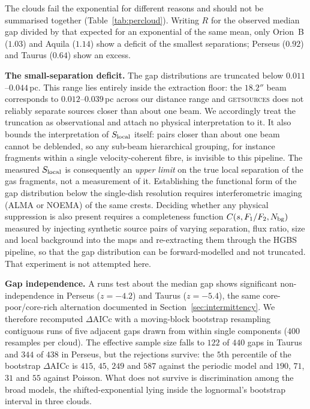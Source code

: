 \documentclass[usenatbib,twoside,twocolumn]{mnras}
\begin{document}
The clouds fail the exponential for different reasons and should not be summarised together (Table~\ref{tab:percloud}). Writing $R$ for the observed median gap divided by that expected for an exponential of the same mean, only Orion~B ($1.03$) and Aquila ($1.14$) show a deficit of the smallest separations; Perseus ($0.92$) and Taurus ($0.64$) show an excess.

\smallskip\noindent\textbf{The small-separation deficit.} The gap distributions are truncated below $0.011$--$0.044$\,pc. This range lies entirely inside the extraction floor: the $18.2''$ beam corresponds to $0.012$--$0.039$\,pc across our distance range and \textsc{getsources} does not reliably separate sources closer than about one beam. We accordingly treat the truncation as observational and attach no physical interpretation to it. It also bounds the interpretation of $S_{\rm local}$ itself: pairs closer than about one beam cannot be deblended, so any sub-beam hierarchical grouping, for instance fragments within a single velocity-coherent fibre, is invisible to this pipeline. The measured $S_{\rm local}$ is consequently an \emph{upper limit} on the true local separation of the gas fragments, not a measurement of it. Establishing the functional form of the gap distribution below the single-dish resolution requires interferometric imaging (ALMA or NOEMA) of the same crests. Deciding whether any physical suppression is also present requires a completeness function $C(s,F_1/F_2,N_{\rm bg})$ measured by injecting synthetic source pairs of varying separation, flux ratio, size and local background into the maps and re-extracting them through the HGBS pipeline, so that the gap distribution can be forward-modelled and not truncated. That experiment is not attempted here.

\smallskip\noindent\textbf{Gap independence.} A runs test about the median gap shows significant non-independence in Perseus ($z=-4.2$) and Taurus ($z=-5.4$), the same core-poor/core-rich alternation documented in Section~\ref{sec:intermittency}. We therefore recomputed $\Delta$AICc with a moving-block bootstrap resampling contiguous runs of five adjacent gaps drawn from within single components ($400$ resamples per cloud). The effective sample size falls to $122$ of $440$ gaps in Taurus and $344$ of $438$ in Perseus, but the rejections survive: the $5$th percentile of the bootstrap $\Delta$AICc is $415$, $45$, $249$ and $587$ against the periodic model and $190$, $71$, $31$ and $55$ against Poisson. What does not survive is discrimination among the broad models, the shifted-exponential lying inside the lognormal's bootstrap interval in three clouds.
\end{document}
